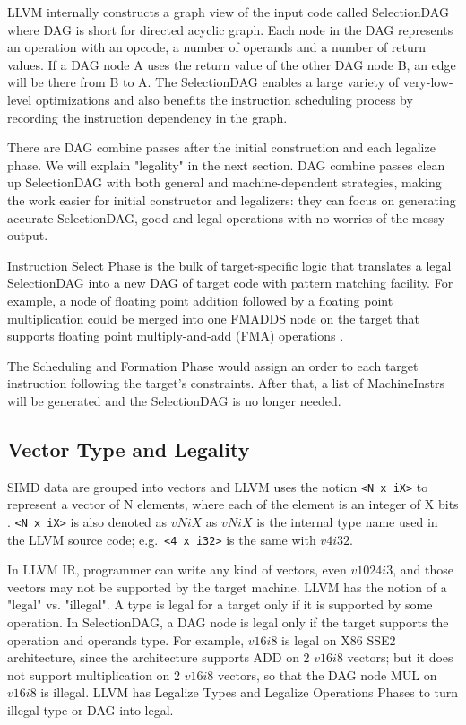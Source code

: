 LLVM internally constructs a graph view of the input code called SelectionDAG where DAG is short for directed acyclic graph. Each node in the DAG represents an operation with an opcode, a number of operands and a number of return values. If a DAG node A uses the return value of the other DAG node B, an edge will be there from B to A. The SelectionDAG enables a large variety of very-low-level optimizations and also benefits the instruction scheduling process by recording the instruction dependency in the graph.

There are DAG combine passes after the initial construction and each legalize phase\cite{llvm_code_gen}. We will explain "legality" in the next section. DAG combine passes clean up SelectionDAG with both general and machine-dependent strategies, making the work easier for initial constructor and legalizers: they can focus on generating accurate SelectionDAG, good and legal operations with no worries of the messy output.

Instruction Select Phase is the bulk of target-specific logic that translates a legal SelectionDAG into a new DAG of target code with pattern matching facility. For example, a node of floating point addition followed by a floating point multiplication could be merged into one FMADDS node on the target that supports floating point multiply-and-add (FMA) operations \cite{llvm_code_gen}.

The Scheduling and Formation Phase would assign an order to each target instruction following the target's constraints. After that, a list of MachineInstrs will be generated and the SelectionDAG is no longer needed.

\subsection{Vector Type and Legality}
SIMD data are grouped into vectors and LLVM uses the notion \verb|<N x iX>| to represent a vector of N elements, where each of the element is an integer of X bits \cite{llvm_lang_ref, hybrid_simd_type_legalize}. \verb|<N x iX>| is also denoted as $vNiX$ as $vNiX$ is the internal type name used in the LLVM source code; e.g.\ \verb|<4 x i32>| is the same with $v4i32$.

In LLVM IR, programmer can write any kind of vectors, even $v1024i3$, and those vectors may not be supported by the target machine. LLVM has the notion of a "legal" vs. "illegal". A type is legal for a target only if it is supported by some operation. In SelectionDAG, a DAG node is legal only if the target supports the operation and operands type. For example, $v16i8$ is legal on X86 SSE2 architecture, since the architecture supports ADD on 2 $v16i8$ vectors; but it does not support multiplication on 2 $v16i8$ vectors, so that the DAG node MUL on $v16i8$ is illegal. LLVM has Legalize Types and Legalize Operations Phases to turn illegal type or DAG into legal\cite{llvm_code_gen}.

